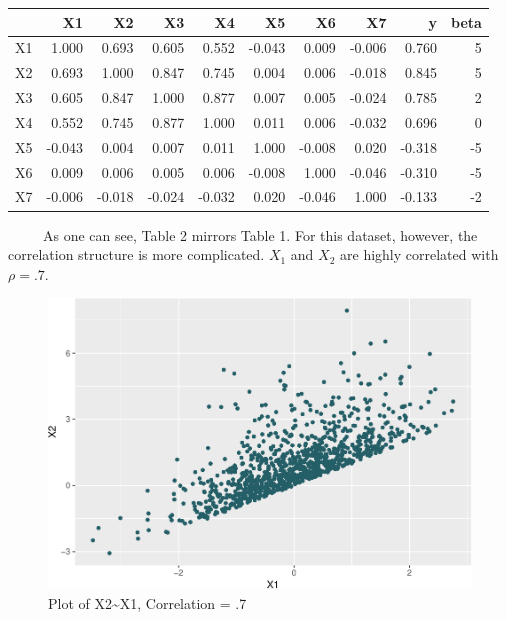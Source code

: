 \documentclass[12pt,twoside]{reedthesis}
\begin{document}
  \begin{tabular}{l|r|r|r|r|r|r|r|r|r}
  \hline
    & X1 & X2 & X3 & X4 & X5 & X6 & X7 & y & beta\\
  \hline
  X1 & 1.000 & 0.693 & 0.605 & 0.552 & -0.043 & 0.009 & -0.006 & 0.760 & 5\\
  \hline
  X2 & 0.693 & 1.000 & 0.847 & 0.745 & 0.004 & 0.006 & -0.018 & 0.845 & 5\\
  \hline
  X3 & 0.605 & 0.847 & 1.000 & 0.877 & 0.007 & 0.005 & -0.024 & 0.785 & 2\\
  \hline
  X4 & 0.552 & 0.745 & 0.877 & 1.000 & 0.011 & 0.006 & -0.032 & 0.696 & 0\\
  \hline
  X5 & -0.043 & 0.004 & 0.007 & 0.011 & 1.000 & -0.008 & 0.020 & -0.318 & -5\\
  \hline
  X6 & 0.009 & 0.006 & 0.005 & 0.006 & -0.008 & 1.000 & -0.046 & -0.310 & -5\\
  \hline
  X7 & -0.006 & -0.018 & -0.024 & -0.032 & 0.020 & -0.046 & 1.000 & -0.133 & -2\\
  \hline
  \end{tabular}
  
  ~~~~~As one can see, Table 2 mirrors Table 1. For this dataset, however,
  the correlation structure is more complicated. \(X_1\) and \(X_2\) are
  highly correlated with \(\rho = .7\).
  
  \begin{figure}[htbp]
  \centering
  \includegraphics{Thesis_files/figure-latex/x2x2-1.pdf}
  \caption{\label{fig:x2x2}Plot of X2\textasciitilde{}X1, Correlation = .7}
  \end{figure}
  
\end{document}
